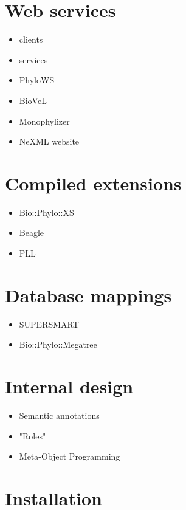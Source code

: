 \documentclass{bioinfo}
\begin{document}
\section{Web services}

\begin{itemize}
\item clients
\item services
\item PhyloWS
\item BioVeL
\item Monophylizer
\item NeXML website
\end{itemize}

\section{Compiled extensions}

\begin{itemize}
\item Bio::Phylo::XS
\item Beagle
\item PLL
\end{itemize}

\section{Database mappings}

\begin{itemize}
\item SUPERSMART
\item Bio::Phylo::Megatree
\end{itemize}

\section{Internal design}

\begin{itemize}
\item Semantic annotations
\item "Roles"
\item Meta-Object Programming
\end{itemize}

\section{Installation}
\end{document}
